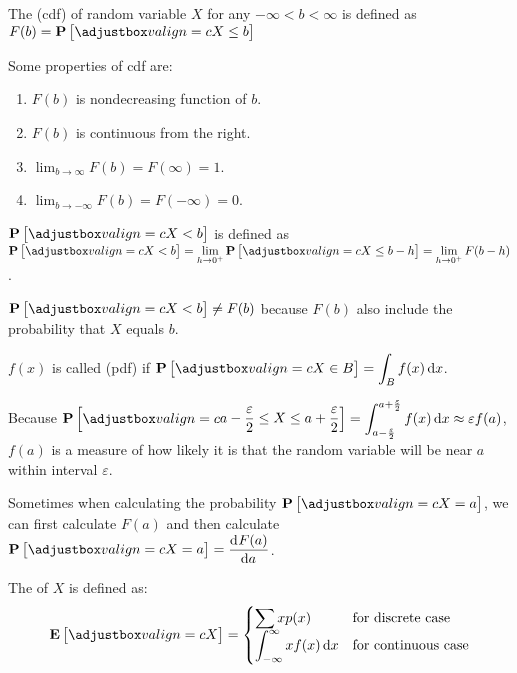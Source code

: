 \begin{definition}[cdf]
    The  (cdf) of random variable $X$ for any $- \infty < b < \infty$ is defined as $F(b) = \probability{ X \leq b }$
\end{definition}

\begin{theorem}
    Some properties of cdf are:
    \begin{enumerate}
        \item $F(b)$ is nondecreasing function of $b$.
        \item $F(b)$ is continuous from the right.
        \item $\lim_{b \rightarrow \infty} F(b) = F(\infty) = 1$.
        \item $\lim_{b \rightarrow -\infty} F(b) = F(- \infty) = 0$.
    \end{enumerate}
\end{theorem}

\begin{definition}
    $\probability{X < b}$ is defined as $\probability{ X < b } = \displaystyle \lim_{h \rightarrow 0^+} \probability{ X \leq b - h } = \lim_{h \rightarrow 0^+} F(b-h)$.
\end{definition}

$\probability{X < b} \neq F(b)$ because $F(b)$ also include the probability that $X$ equals $b$.



\begin{definition}
    $f(x)$ is called  (pdf) if $\probability{X \in B} = {\displaystyle \int_B f(x) \dif{x}} $.
\end{definition}

Because $\probability{ a - \frac{\varepsilon}{2} \leq X \leq a + \frac{\varepsilon}{2} } =\displaystyle \int_{a - \frac{\varepsilon}{2}}^{a + \frac{\varepsilon}{2}} f(x) \dif{x} \approx \varepsilon f(a)  $, $f(a)$ is a measure of how likely it is that the random variable will be near $a$ within interval $\varepsilon$.


Sometimes when calculating the probability $\probability{X=a}$, we can first calculate $F(a)$ and then calculate $\probability{X=a} = \dod{F(a)}{a}$.

\begin{definition}[expectation]
    The  of $X$ is defined as:
    \begin{equation}
        \expect{X} = \begin{cases}
            \displaystyle \sum x p(x) & \text{for discrete case} \\
            \displaystyle \int_{-\infty}^{\infty} x f(x) \dif{x} & \text{for continuous case}
        \end{cases}
    \end{equation}
\end{definition}





